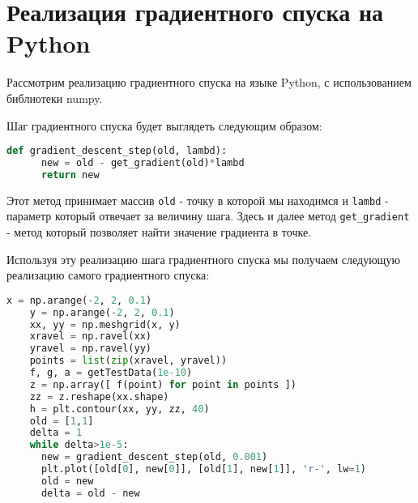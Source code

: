 \documentclass[12pt]{report}
\begin{document}
  \chapter{Реализация градиентного спуска на Python}
  Рассмотрим реализацию градиентного спуска на языке Python, с использованием
  библиотеки numpy.

  Шаг градиентного спуска будет выглядеть следующим образом:

  \begin{lstlisting}[language=Python, frame=single]
    def gradient_descent_step(old, lambd):
      new = old - get_gradient(old)*lambd
      return new
  \end{lstlisting}

  Этот метод принимает массив \verb|old| - точку в которой мы находимся и
  \verb|lambd| - параметр который отвечает за величину шага. Здесь и далее метод
  \verb|get_gradient| - метод который позволяет найти значение градиента в точке.

  Используя эту реализацию шага градиентного спуска мы получаем следующую
  реализацию самого градиентного спуска:

  \begin{lstlisting}[language=Python, frame=single]
    x = np.arange(-2, 2, 0.1)
    y = np.arange(-2, 2, 0.1)
    xx, yy = np.meshgrid(x, y)
    xravel = np.ravel(xx)
    yravel = np.ravel(yy)
    points = list(zip(xravel, yravel))
    f, g, a = getTestData(1e-10)
    z = np.array([ f(point) for point in points ])
    zz = z.reshape(xx.shape)
    h = plt.contour(xx, yy, zz, 40)
    old = [1,1]
    delta = 1
    while delta>1e-5:
      new = gradient_descent_step(old, 0.001)
      plt.plot([old[0], new[0]], [old[1], new[1]], 'r-', lw=1)
      old = new
      delta = old - new
  \end{lstlisting}
\end{document}
